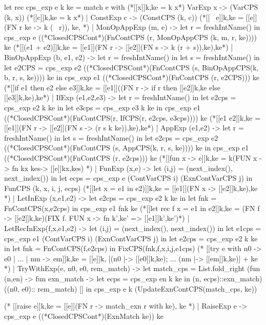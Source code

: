 let rec cps_exp e k ke = 
   match e with 
(*[[x]]k,ke = k x*)
     VarExp x -> (VarCPS (k, x))
(*[[c]]k,ke = k x*)
   | ConstExp c -> (ConstCPS (k, c))
(*[[~ e]]k,ke = [[e]](FN r ke -> k (~ r)), ke, *)
   | MonOpAppExp (m, e) ->
      let r = freshIntName() in
      cps_exp e ((*ClosedCPSCont*)(FnContCPS (r, MonOpAppCPS (k, m, r, ke)))) ke
(*[[(e1 + e2)]]k,ke = [[e1]](FN r -> [[e2]](FN s -> k (r + s)),ke),ke*)
   | BinOpAppExp (b, e1, e2) ->
      let r = freshIntName()  in 
      let s = freshIntName()  in 
      let e2CPS =
       cps_exp e2 ((*ClosedCPSCont*)(FnContCPS (s, BinOpAppCPS(k, b, r, s, ke)))) ke in
      cps_exp e1 ((*ClosedCPSCont*)(FnContCPS (r, e2CPS))) ke
(*[[if e1 then e2 else e3]]k,ke = [[e1]]((FN r -> if r then [[e2]]k,ke else [[e3]]k,ke),ke*)
   | IfExp (e1,e2,e3) ->
      let r =  freshIntName() in 
      let e2cps = cps_exp e2 k ke  in
      let e3cps = cps_exp e3 k ke in 
      cps_exp e1 ((*ClosedCPSCont*)(FnContCPS(r, IfCPS(r, e2cps, e3cps)))) ke
(*[[e1 e2]]k,ke = [[e1]](FN r -> [[e2]](FN s -> (r s k ke)),ke),ke*)
   | AppExp (e1,e2) -> 
      let r = freshIntName() in
      let s = freshIntName() in
      let e2cps =
          cps_exp e2 ((*ClosedCPSCont*)(FnContCPS (s, AppCPS(k, r, s, ke)))) ke in
      cps_exp e1 ((*ClosedCPSCont*)(FnContCPS (r, e2cps))) ke
(*[[fun x -> e]]k,ke = k(FUN x -> fn kx kes-> [[e]]kx,kes) *)
   | FunExp (x,e) ->
     let (i,j) = (next_index(), next_index()) in
     let ecps = cps_exp e (ContVarCPS i) (ExnContVarCPS j) in
     FunCPS (k, x, i, j, ecps)
(*[[let x = e1 in e2)]]k,ke = [[e1]](FN x -> [[e2]]k,ke),ke *)
   | LetInExp (x,e1,e2) -> 
     let e2cps = cps_exp e2 k ke in 
     let fnk = FnContCPS(x,e2cps) in cps_exp e1 fnk ke
(*[[let rec f x = e1 in e2]]k,ke =
  (FN f -> [[e2]]k,ke)(FIX f. FUN x -> fn k',ke' => [[e1]]k',ke')*)
   | LetRecInExp(f,x,e1,e2) ->
     let (i,j) = (next_index(), next_index()) in
     let e1cps = cps_exp e1 (ContVarCPS i) (ExnContVarCPS j)  in 
     let e2cps = cps_exp e2 k ke in 
     let fnk = FnContCPS(f,e2cps) in
     FixCPS(fnk,f,x,i,j,e1cps)
(* [[try e with n0 -> e0 | ... | nm -> em]]k,ke =
   [[e]]k, [(n0 |-> [[e0]]k,ke); ... (nm |-> [[em]]k,ke)] + ke *)
   | TryWithExp(e, n0, e0, rem_match) ->
     let match_cps =
         List.fold_right
          (fun (n,en) -> fun exn_match ->
           let ecps = cps_exp en k ke in
               (n, ecps)::exn_match)
          ((n0, e0):: rem_match)
          []
     in cps_exp e k (UpdateExnContCPS(match_cps, ke))

(* [[raise e]]k,ke = [[e]](FN r -> match_exn r with ke), ke *)
   | RaiseExp e -> cps_exp e ((*ClosedCPSCont*)(ExnMatch ke)) ke

